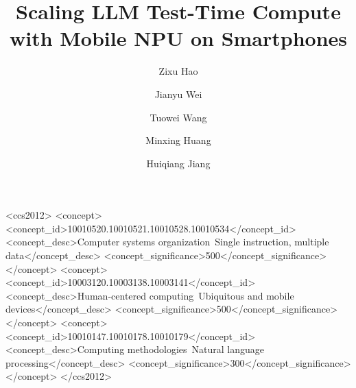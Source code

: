 \documentclass[sigplan,10pt]{acmart}
\begin{document}

\begin{CCSXML}
<ccs2012>
   <concept>
       <concept_id>10010520.10010521.10010528.10010534</concept_id>
       <concept_desc>Computer systems organization~Single instruction, multiple data</concept_desc>
       <concept_significance>500</concept_significance>
       </concept>
   <concept>
       <concept_id>10003120.10003138.10003141</concept_id>
       <concept_desc>Human-centered computing~Ubiquitous and mobile devices</concept_desc>
       <concept_significance>500</concept_significance>
       </concept>
   <concept>
       <concept_id>10010147.10010178.10010179</concept_id>
       <concept_desc>Computing methodologies~Natural language processing</concept_desc>
       <concept_significance>300</concept_significance>
       </concept>
 </ccs2012>
\end{CCSXML}



\graphicspath{ {./figures/} }
\title{Scaling LLM Test-Time Compute with Mobile NPU on Smartphones}

\author{Zixu Hao}

\author{Jianyu Wei}

\author{Tuowei Wang}

\author{Minxing Huang}

\author{Huiqiang Jiang}
\end{document}
